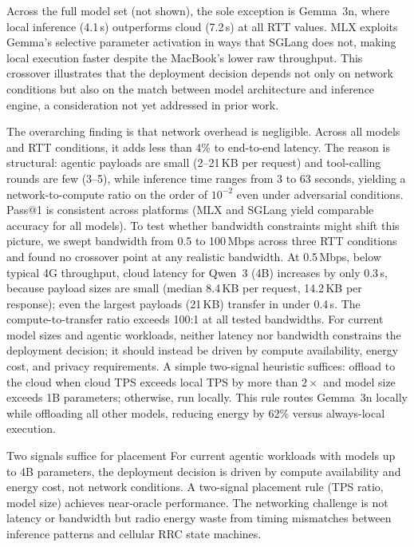\documentclass[sigconf,anonymous,review]{acmart}
\begin{document}
Across the full model set (not shown), the sole exception is Gemma~3n, where local inference (4.1\,s) outperforms cloud (7.2\,s) at all RTT values. MLX exploits Gemma's selective parameter activation in ways that SGLang does not, making local execution faster despite the MacBook's lower raw throughput. This crossover illustrates that the deployment decision depends not only on network conditions but also on the match between model architecture and inference engine, a consideration not yet addressed in prior work.

The overarching finding is that network overhead is negligible. Across all models and RTT conditions, it adds less than 4\% to end-to-end latency. The reason is structural: agentic payloads are small (2--21\,KB per request) and tool-calling rounds are few (3--5), while inference time ranges from 3 to 63 seconds, yielding a network-to-compute ratio on the order of $10^{-2}$ even under adversarial conditions. Pass@1 is consistent across platforms (MLX and SGLang yield comparable accuracy for all models). To test whether bandwidth constraints might shift this picture, we swept bandwidth from 0.5 to 100\,Mbps across three RTT conditions and found no crossover point at any realistic bandwidth. At 0.5\,Mbps, below typical 4G throughput, cloud latency for Qwen~3 (4B) increases by only 0.3\,s, because payload sizes are small (median 8.4\,KB per request, 14.2\,KB per response); even the largest payloads (21\,KB) transfer in under 0.4\,s. The compute-to-transfer ratio exceeds 100:1 at all tested bandwidths. For current model sizes and agentic workloads, neither latency nor bandwidth constrains the deployment decision; it should instead be driven by compute availability, energy cost, and privacy requirements. A simple two-signal heuristic suffices: offload to the cloud when cloud TPS exceeds local TPS by more than $2\times$ and model size exceeds 1B parameters; otherwise, run locally. This rule routes Gemma~3n locally while offloading all other models, reducing energy by 62\% versus always-local execution.

\begin{insightbox}{Two signals suffice for placement}
For current agentic workloads with models up to 4B parameters, the deployment decision is driven by compute availability and energy cost, not network conditions.
A two-signal placement rule (TPS ratio, model size) achieves near-oracle performance.
The networking challenge is not latency or bandwidth but radio energy waste from timing mismatches between inference patterns and cellular RRC state machines.
\end{insightbox}
\end{document}
